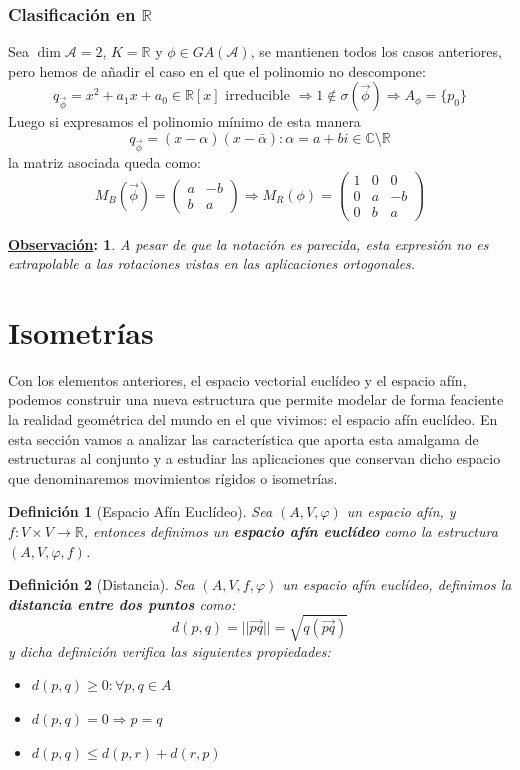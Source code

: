 \documentclass[10pt,a4paper,openright]{book}
\theoremstyle{break}
\newtheorem*{defi}{Definición}
\newtheorem*{obs}{\underline{Observación}:}
\begin{document}
\subsubsection{Clasificación en $\mathbb{R}$}
Sea $\dim \mathcal{A} = 2$, $K = \mathbb{R}$ y $\phi \in GA(\mathcal{A})$, se mantienen todos los casos anteriores, pero hemos de añadir el caso en el que el polinomio no descompone:
$$q_{\vec{\phi}} = x^2 + a_1x + a_0 \in \mathbb{R}[x] \mbox{ irreducible } \Rightarrow 1 \notin \sigma(\vec{\phi}) \Rightarrow A_\phi = \{p_0\}$$
Luego si expresamos el polinomio mínimo de esta manera
$$q_{\vec{\phi}} = (x- \alpha)(x - \bar{\alpha}) : \alpha = a + bi \in \mathbb{C} \setminus \mathbb{R}$$
la matriz asociada queda como:
$$M_B (\vec{\phi}) = \begin{pmatrix}
a & -b \\ b & a
\end{pmatrix}\Rightarrow M_R (\phi) =  \left(\begin{array}{c|cc}
1  & 0 & 0 \\
\hline
0 & a &  -b \\
0 & b &  a
\end{array}
\right)$$

\begin{obs}
A pesar de que la notación es parecida, esta expresión no es extrapolable a las rotaciones vistas en las aplicaciones ortogonales.
\end{obs}

\section{Isometrías}
Con los elementos anteriores, el espacio vectorial euclídeo y el espacio afín, podemos construir una nueva estructura que permite modelar de forma feaciente la realidad geométrica del mundo en el que vivimos: el espacio afín euclídeo. En esta sección vamos a analizar las característica que aporta esta amalgama de estructuras al conjunto y a estudiar las aplicaciones que conservan dicho espacio que denominaremos movimientos rígidos o isometrías.

\begin{defi}[Espacio Afín Euclídeo]
Sea $(A, V, \varphi)$ un espacio afín, y $f: V \times V \rightarrow \mathbb R$, entonces definimos un \textbf{espacio afín euclídeo} como la estructura $(A,V,\varphi, f)$.
\end{defi}

\begin{defi}[Distancia]
Sea $(A,V,f,\varphi)$ un espacio afín euclídeo, definimos la \textbf{distancia entre dos puntos} como:
$$d(p,q) = ||\vec{pq}|| = \sqrt{q(\vec{pq})}$$
y dicha definición verifica las siguientes propiedades:
\begin{itemize}
\item $d(p,q) \geq 0 : \forall p,q\in A$
\item $d(p,q) = 0\Rightarrow p = q$
\item $d(p,q) \leq d(p,r) + d(r,p)$
\end{itemize}
\end{defi}
\end{document}
